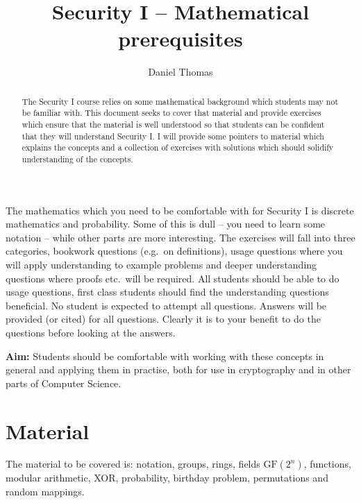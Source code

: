 \documentclass[11pt,a4paper]{article}
\author{Daniel Thomas}
\title{Security I -- Mathematical prerequisites}
\begin{document}
\maketitle

\begin{abstract}
The Security I course relies on some mathematical background which students may not be familiar with.
This document seeks to cover that material and provide exercises which ensure that the material is well understood so that students can be confident that they will understand Security I.
I will provide some pointers to material which explains the concepts and a collection of exercises with solutions which should solidify understanding of the concepts.
\end{abstract}

The mathematics which you need to be comfortable with for Security I is discrete mathematics and probability.
Some of this is dull -- you need to learn some notation -- while other parts are more interesting.
The exercises will fall into three categories, bookwork questions (e.g.\ on definitions), usage questions where you will apply understanding to example problems and deeper understanding questions where proofs etc.\ will be required.
All students should be able to do usage questions, first class students should find the understanding questions beneficial.
No student is expected to attempt all questions.
Answers will be provided (or cited) for all questions.
Clearly it is to your benefit to do the questions before looking at the answers.

{\bf Aim:} Students should be comfortable with working with these concepts in general and applying them in practise, both for use in cryptography and in other parts of Computer Science.

\section*{Material}
The material to be covered is: notation, groups, rings, fields $\mathrm{GF}(2^n)$, functions, modular arithmetic, XOR, probability, birthday problem, permutations and random mappings.
\end{document}
